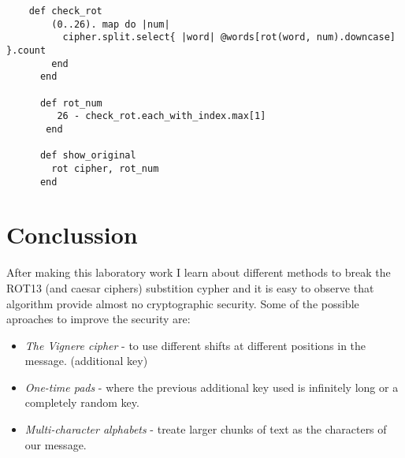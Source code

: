 \documentclass{article}
\begin{document}
   \begin{lstlisting}
    def check_rot
        (0..26). map do |num|
          cipher.split.select{ |word| @words[rot(word, num).downcase] }.count
        end
      end

      def rot_num
         26 - check_rot.each_with_index.max[1]
       end

      def show_original
        rot cipher, rot_num
      end
   \end{lstlisting}

 \section{Conclussion}

    After making this laboratory work I learn about different methods to break the ROT13 (and caesar ciphers) substition cypher
    and it is easy to observe that algorithm provide almost no cryptographic security. Some of the possible aproaches to
    improve the security are:

    \begin{itemize}
        \item \textit{The Vignere cipher} -  to use different shifts at different positions in the message. (additional key)
        \item \textit{One-time pads}  - where the previous additional key used is infinitely long or a completely random key.
        \item \textit{Multi-character alphabets} - treate larger chunks of text as the characters of our message.
    \end{itemize}
\end{document}
